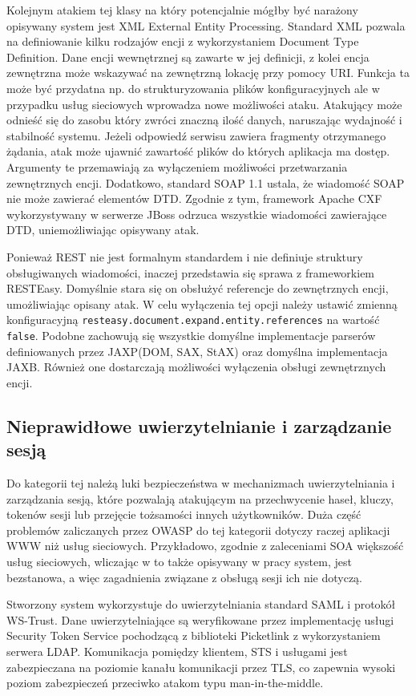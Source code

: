 	Kolejnym atakiem tej klasy na który potencjalnie mógłby być narażony opisywany system jest XML External Entity Processing. Standard XML pozwala na definiowanie kilku rodzajów encji z wykorzystaniem Document Type Definition. Dane encji wewnętrznej są zawarte w jej definicji, z kolei encja zewnętrzna może wskazywać na zewnętrzną lokację przy pomocy URI. Funkcja ta może być przydatna np. do strukturyzowania plików konfiguracyjnych ale w przypadku usług sieciowych wprowadza nowe możliwości ataku. Atakujący może odnieść się do zasobu który zwróci znaczną ilość danych, naruszając wydajność i stabilność systemu. Jeżeli odpowiedź serwisu zawiera fragmenty otrzymanego żądania, atak może ujawnić zawartość plików do których aplikacja ma dostęp. Argumenty te przemawiają za wyłączeniem możliwości przetwarzania zewnętrznych encji. Dodatkowo, standard SOAP 1.1 ustala, że wiadomość SOAP nie może zawierać elementów DTD. Zgodnie z tym, framework Apache CXF wykorzystywany w serwerze JBoss odrzuca wszystkie wiadomości zawierające DTD\cite{ApacheCXF}, uniemożliwiając opisywany atak.
	
	Ponieważ REST nie jest formalnym standardem i nie definiuje struktury obsługiwanych wiadomości, inaczej przedstawia się sprawa z frameworkiem RESTEasy. Domyślnie stara się on obsłużyć referencje do zewnętrznych encji, umożliwiając opisany atak. W celu wyłączenia tej opcji należy ustawić zmienną konfiguracyjną \texttt{resteasy.document.expand.entity.references} na wartość \texttt{false}. Podobne zachowują się wszystkie domyślne implementacje parserów definiowanych przez JAXP(DOM, SAX, StAX)  oraz domyślna implementacja JAXB. Również one dostarczają możliwości wyłączenia obsługi zewnętrznych encji.

\subsection{Nieprawidłowe uwierzytelnianie i zarządzanie sesją}

	Do kategorii tej należą luki bezpieczeństwa w mechanizmach uwierzytelniania i zarządzania sesją, które pozwalają atakującym na przechwycenie haseł, kluczy, tokenów sesji lub przejęcie tożsamości innych użytkowników.
	Duża część problemów zaliczanych przez OWASP do tej kategorii dotyczy raczej aplikacji WWW niż usług sieciowych. Przykładowo, zgodnie z zaleceniami SOA większość usług sieciowych, wliczając w to także opisywany w pracy system, jest bezstanowa, a więc zagadnienia związane z obsługą sesji ich nie dotyczą. 

	Stworzony system wykorzystuje do uwierzytelniania standard SAML i protokół WS-Trust. Dane uwierzytelniające są weryfikowane przez implementację usługi Security Token Service pochodzącą z biblioteki Picketlink z wykorzystaniem serwera LDAP. Komunikacja pomiędzy klientem, STS i usługami jest zabezpieczana na poziomie kanału komunikacji przez TLS, co zapewnia wysoki poziom zabezpieczeń przeciwko atakom typu man-in-the-middle.

